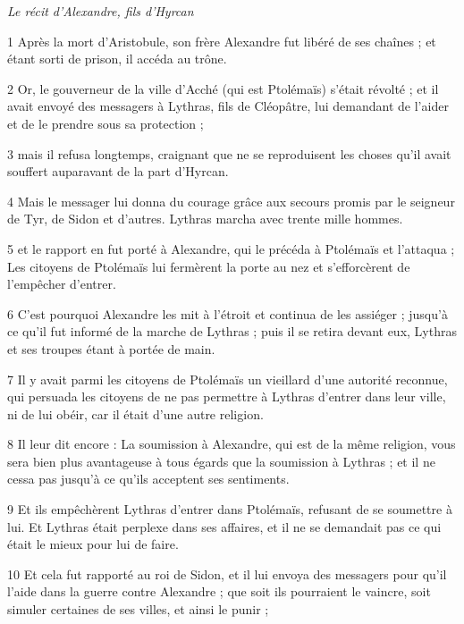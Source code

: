 \par \textit{Le récit d'Alexandre, fils d'Hyrcan}

\par 1 Après la mort d'Aristobule, son frère Alexandre fut libéré de ses chaînes ; et étant sorti de prison, il accéda au trône.

\par 2 Or, le gouverneur de la ville d'Acché (qui est Ptolémaïs) s'était révolté ; et il avait envoyé des messagers à Lythras, fils de Cléopâtre, lui demandant de l'aider et de le prendre sous sa protection ;

\par 3 mais il refusa longtemps, craignant que ne se reproduisent les choses qu'il avait souffert auparavant de la part d'Hyrcan.

\par 4 Mais le messager lui donna du courage grâce aux secours promis par le seigneur de Tyr, de Sidon et d'autres. Lythras marcha avec trente mille hommes.

\par 5 et le rapport en fut porté à Alexandre, qui le précéda à Ptolémaïs et l'attaqua ; Les citoyens de Ptolémaïs lui fermèrent la porte au nez et s'efforcèrent de l'empêcher d'entrer.

\par 6 C'est pourquoi Alexandre les mit à l'étroit et continua de les assiéger ; jusqu'à ce qu'il fut informé de la marche de Lythras ; puis il se retira devant eux, Lythras et ses troupes étant à portée de main.

\par 7 Il y avait parmi les citoyens de Ptolémaïs un vieillard d'une autorité reconnue, qui persuada les citoyens de ne pas permettre à Lythras d'entrer dans leur ville, ni de lui obéir, car il était d'une autre religion.

\par 8 Il leur dit encore : La soumission à Alexandre, qui est de la même religion, vous sera bien plus avantageuse à tous égards que la soumission à Lythras ; et il ne cessa pas jusqu'à ce qu'ils acceptent ses sentiments.

\par 9 Et ils empêchèrent Lythras d'entrer dans Ptolémaïs, refusant de se soumettre à lui. Et Lythras était perplexe dans ses affaires, et il ne se demandait pas ce qui était le mieux pour lui de faire.

\par 10 Et cela fut rapporté au roi de Sidon, et il lui envoya des messagers pour qu'il l'aide dans la guerre contre Alexandre ; que soit ils pourraient le vaincre, soit simuler certaines de ses villes, et ainsi le punir ;

